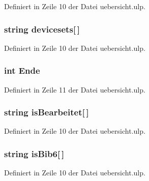 Definiert in Zeile 10 der Datei uebersicht.\+ulp.

\hypertarget{uebersicht_8ulp_a3c2db7b0549d69977226cb078c693adc}{}
\subsubsection[{devicesets}]{\setlength{\rightskip}{0pt plus 5cm}string devicesets\mbox{[}$\,$\mbox{]}}\label{uebersicht_8ulp_a3c2db7b0549d69977226cb078c693adc}


Definiert in Zeile 10 der Datei uebersicht.\+ulp.

\hypertarget{uebersicht_8ulp_a0d22d412dec2a1371e015794097a5d98}{}
\subsubsection[{Ende}]{\setlength{\rightskip}{0pt plus 5cm}int Ende}\label{uebersicht_8ulp_a0d22d412dec2a1371e015794097a5d98}


Definiert in Zeile 11 der Datei uebersicht.\+ulp.

\hypertarget{uebersicht_8ulp_a453e4761a92f7a8c4a625504ab144252}{}
\subsubsection[{is\+Bearbeitet}]{\setlength{\rightskip}{0pt plus 5cm}string is\+Bearbeitet\mbox{[}$\,$\mbox{]}}\label{uebersicht_8ulp_a453e4761a92f7a8c4a625504ab144252}


Definiert in Zeile 10 der Datei uebersicht.\+ulp.

\hypertarget{uebersicht_8ulp_a27725d3ac23a3dc038926bed555fddab}{}
\subsubsection[{is\+Bib6}]{\setlength{\rightskip}{0pt plus 5cm}string is\+Bib6\mbox{[}$\,$\mbox{]}}\label{uebersicht_8ulp_a27725d3ac23a3dc038926bed555fddab}


Definiert in Zeile 10 der Datei uebersicht.\+ulp.


